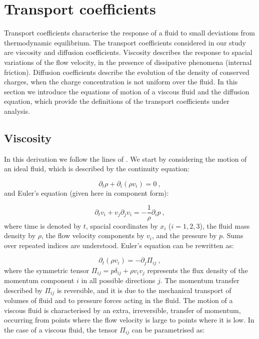 
\section{Transport coefficients}

Transport coefficients characterise the response of a fluid to small deviations from thermodynamic equilibrium. The transport coefficients considered in our study are viscosity and diffusion coefficients. Viscosity describes the response to spacial variations of the flow velocity, in the presence of dissipative phenomena (internal friction). Diffusion coefficients describe the evolution of the density of conserved charges, when the charge concentration is not uniform over the fluid. In this section we introduce the equations of motion of a viscous fluid and the diffusion equation, which provide the definitions of the transport coefficients under analysis.

\subsection{Viscosity}

In this derivation we follow the lines of \cite{landau2013fluid}. We start by considering the motion of an ideal fluid, which is described by the continuity equation:

\begin{equation}
\partial_t \rho + \partial_i (\rho v_i) = 0 \: ,
\end{equation}
%
and Euler's equation (given here in component form):

\begin{equation}
\partial_t v_i +  v_j \partial_j v_i = -\frac{1}{\rho} \partial_i p \: ,
\end{equation}
%
where time is denoted by $t$, spacial coordinates by $x_i$ ($i=1,2,3$), the fluid mass density by $\rho$, the flow velocity components by $v_i$,  and the pressure by $p$. Sums over repeated indices are understood. Euler's equation can be rewritten as:

\begin{equation}
\partial_t (\rho v_i) = - \partial_j \Pi_{ij} \: ,
\label{Euler}
\end{equation}
%
where the symmetric tensor $\Pi_{ij} = p \delta_{ij} + \rho v_i v_j$ represents the flux density of the momentum component $i$ in all possible directions $j$. The momentum transfer described by $\Pi_{ij}$ is reversible, and it is due to the mechanical transport of volumes of fluid and to pressure forces acting in the fluid. The motion of a viscous fluid is characterised by an extra, irreversible, transfer of momentum, occurring from points where the flow velocity is large to points where it is low.
In the case of a viscous fluid, the tensor $\Pi_{ij}$ can be parametrised as:

